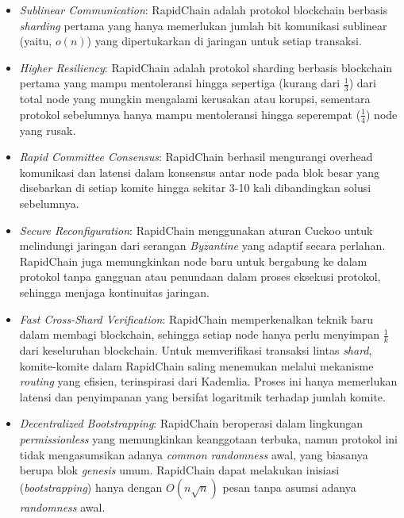 \begin{itemize}
  \item \textit{Sublinear Communication}: RapidChain adalah protokol blockchain berbasis \textit{sharding} pertama yang hanya memerlukan jumlah bit komunikasi sublinear (yaitu, $o(n)$) yang dipertukarkan di jaringan untuk setiap transaksi.
  \item \textit{Higher Resiliency}: RapidChain adalah protokol sharding berbasis blockchain pertama yang mampu mentoleransi hingga sepertiga (kurang dari $\frac{1}{3}$) dari total node yang mungkin mengalami kerusakan atau korupsi, sementara protokol sebelumnya hanya mampu mentoleransi hingga seperempat ($\frac{1}{4}$) node yang rusak.
  \item \textit{Rapid Committee Consensus}: RapidChain berhasil mengurangi overhead komunikasi dan latensi dalam konsensus antar node pada blok besar yang disebarkan di setiap komite hingga sekitar 3-10 kali dibandingkan solusi sebelumnya.
  \item \textit{Secure Reconfiguration}: RapidChain menggunakan aturan Cuckoo untuk melindungi jaringan dari serangan \textit{Byzantine} yang adaptif secara perlahan. RapidChain juga memungkinkan node baru untuk bergabung ke dalam protokol tanpa gangguan atau penundaan dalam proses eksekusi protokol, sehingga menjaga kontinuitas jaringan.
  \item \textit{Fast Cross-Shard Verification}: RapidChain memperkenalkan teknik baru dalam membagi blockchain, sehingga setiap node hanya perlu menyimpan $\frac{1}{k}$ dari keseluruhan blockchain. Untuk memverifikasi transaksi lintas \textit{shard}, komite-komite dalam RapidChain saling menemukan melalui mekanisme \textit{routing} yang efisien, terinspirasi dari Kademlia. Proses ini hanya memerlukan latensi dan penyimpanan yang bersifat logaritmik terhadap jumlah komite.
  \item \textit{Decentralized Bootstrapping}: RapidChain beroperasi dalam lingkungan \textit{permissionless} yang memungkinkan keanggotaan terbuka, namun protokol ini tidak mengasumsikan adanya \textit{common randomness} awal, yang biasanya berupa blok \textit{genesis} umum. RapidChain dapat melakukan inisiasi (\textit{bootstrapping}) hanya dengan $O(n \sqrt{n})$ pesan tanpa asumsi adanya \textit{randomness} awal.
\end{itemize}